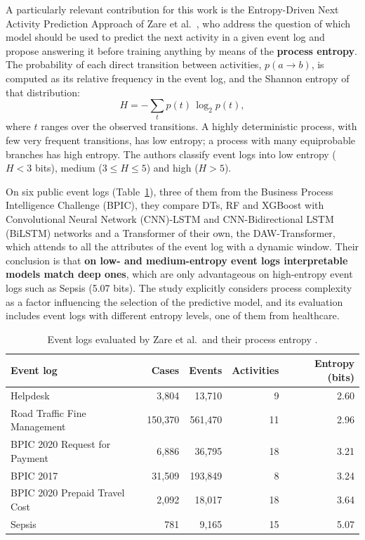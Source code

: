 A particularly relevant contribution for this work is the Entropy-Driven Next Activity Prediction Approach of Zare et al.\ \cite{zare2025}, who address the question of which model should be used to predict the next activity in a given event log and propose answering it before training anything by means of the \textbf{process entropy}. The probability of each direct transition between activities, $p(a \rightarrow b)$, is computed as its relative frequency in the event log, and the Shannon entropy of that distribution:
\begin{equation}
  H = -\sum_{t} p(t)\,\log_2 p(t),
\end{equation}
where $t$ ranges over the observed transitions. A highly deterministic process, with few very frequent transitions, has low entropy; a process with many equiprobable branches has high entropy. The authors classify event logs into low entropy ($H < 3$ bits), medium ($3 \le H \le 5$) and high ($H > 5$).

On six public event logs (Table~\ref{tab:zare_entropias}), three of them from the Business Process Intelligence Challenge (BPIC), they compare DTs, RF and XGBoost with Convolutional Neural Network (CNN)-LSTM and CNN-Bidirectional LSTM (BiLSTM) networks and a Transformer of their own, the DAW-Transformer, which attends to all the attributes of the event log with a dynamic window. Their conclusion is that \textbf{on low- and medium-entropy event logs interpretable models match deep ones}, which are only advantageous on high-entropy event logs such as Sepsis (5.07 bits). The study explicitly considers process complexity as a factor influencing the selection of the predictive model, and its evaluation includes event logs with different entropy levels, one of them from healthcare.

\begin{table}[htbp]
\centering
\caption[Event logs evaluated by Zare et al.\ and their process entropy.]{Event logs evaluated by Zare et al.\ and their process entropy \cite{zare2025}.}
\label{tab:zare_entropias}
\begin{tabular}{lrrrr}
\toprule
Event log & Cases & Events & Activities & Entropy (bits) \\
\midrule
Helpdesk & 3,804 & 13,710 & 9 & 2.60 \\
Road Traffic Fine Management & 150,370 & 561,470 & 11 & 2.96 \\
BPIC 2020 Request for Payment & 6,886 & 36,795 & 18 & 3.21 \\
BPIC 2017 & 31,509 & 193,849 & 8 & 3.24 \\
BPIC 2020 Prepaid Travel Cost & 2,092 & 18,017 & 18 & 3.64 \\
Sepsis & 781 & 9,165 & 15 & 5.07 \\
\bottomrule
\end{tabular}
\end{table}

